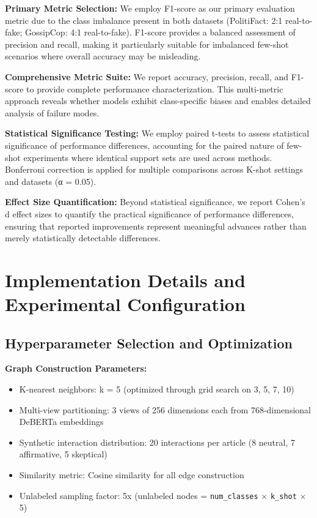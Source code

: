 \textbf{Primary Metric Selection:} We employ F1-score as our primary evaluation metric due to the class imbalance present in both datasets (PolitiFact: 2:1 real-to-fake; GossipCop: 4:1 real-to-fake). F1-score provides a balanced assessment of precision and recall, making it particularly suitable for imbalanced few-shot scenarios where overall accuracy may be misleading.

\textbf{Comprehensive Metric Suite:} We report accuracy, precision, recall, and F1-score to provide complete performance characterization. This multi-metric approach reveals whether models exhibit class-specific biases and enables detailed analysis of failure modes.

\textbf{Statistical Significance Testing:} We employ paired t-tests to assess statistical significance of performance differences, accounting for the paired nature of few-shot experiments where identical support sets are used across methods. Bonferroni correction is applied for multiple comparisons across K-shot settings and datasets (α = 0.05).

\textbf{Effect Size Quantification:} Beyond statistical significance, we report Cohen's d effect sizes to quantify the practical significance of performance differences, ensuring that reported improvements represent meaningful advances rather than merely statistically detectable differences.

\section{Implementation Details and Experimental Configuration}

\subsection{Hyperparameter Selection and Optimization}

\textbf{Graph Construction Parameters:}
\begin{itemize}
\item K-nearest neighbors: k = 5 (optimized through grid search on {3, 5, 7, 10})
\item Multi-view partitioning: 3 views of 256 dimensions each from 768-dimensional DeBERTa embeddings
\item Synthetic interaction distribution: 20 interactions per article (8 neutral, 7 affirmative, 5 skeptical)
\item Similarity metric: Cosine similarity for all edge construction
\item Unlabeled sampling factor: 5x (unlabeled nodes = \texttt{num\_classes} $\times$ \texttt{k\_shot} $\times$ 5)
\end{itemize}

